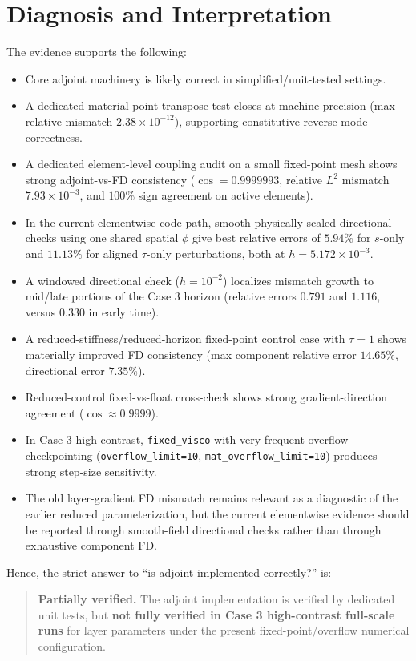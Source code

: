 \documentclass[11pt]{article}
\begin{document}
\section{Diagnosis and Interpretation}
The evidence supports the following:
\begin{itemize}
\item Core adjoint machinery is likely correct in simplified/unit-tested settings.
\item A dedicated material-point transpose test closes at machine precision (max relative mismatch \(2.38\times10^{-12}\)), supporting constitutive reverse-mode correctness.
\item A dedicated element-level coupling audit on a small fixed-point mesh shows strong adjoint-vs-FD consistency (\(\cos=0.9999993\), relative \(L^2\) mismatch \(7.93\times10^{-3}\), and \(100\%\) sign agreement on active elements).
\item In the current elementwise code path, smooth physically scaled directional checks using one shared spatial \(\phi\) give best relative errors of \(5.94\%\) for \(s\)-only and \(11.13\%\) for aligned \(\tau\)-only perturbations, both at \(h=5.172\times10^{-3}\).
\item A windowed directional check (\(h=10^{-2}\)) localizes mismatch growth to mid/late portions of the Case 3 horizon (relative errors \(0.791\) and \(1.116\), versus \(0.330\) in early time).
\item A reduced-stiffness/reduced-horizon fixed-point control case with \(\tau=1\) shows materially improved FD consistency (max component relative error \(14.65\%\), directional error \(7.35\%\)).
\item Reduced-control fixed-vs-float cross-check shows strong gradient-direction agreement (\(\cos\approx 0.9999\)).
\item In Case 3 high contrast, \texttt{fixed\_visco} with very frequent overflow checkpointing (\texttt{overflow\_limit=10}, \texttt{mat\_overflow\_limit=10}) produces strong step-size sensitivity.
\item The old layer-gradient FD mismatch remains relevant as a diagnostic of the earlier reduced parameterization, but the current elementwise evidence should be reported through smooth-field directional checks rather than through exhaustive component FD.
\end{itemize}

Hence, the strict answer to ``is adjoint implemented correctly?'' is:
\begin{quote}
\textbf{Partially verified.} The adjoint implementation is verified by dedicated unit tests, but \textbf{not fully verified in Case 3 high-contrast full-scale runs} for layer parameters under the present fixed-point/overflow numerical configuration.
\end{quote}
\end{document}
